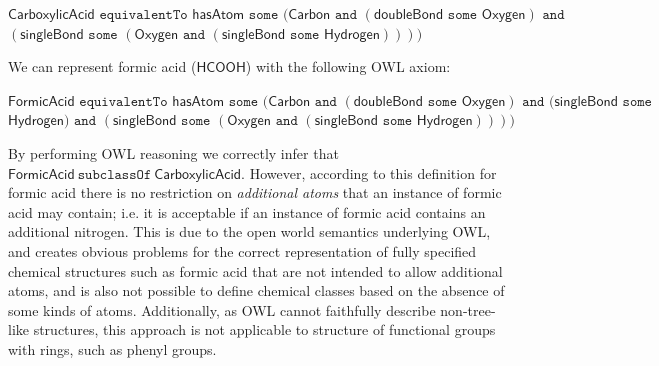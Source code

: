 \documentclass[10pt]{bmc_article}
\newenvironment{bmcformat}{\baselineskip20pt\sloppy\setboolean{publ}{false}}{\baselineskip20pt\sloppy}
\begin{document}
\begin{bmcformat}
\noindent $\mathsf{CarboxylicAcid} \texttt{ equivalentTo } \mathsf{hasAtom} \texttt{ some } 
	(\mathsf{Carbon} \texttt{ and } (\mathsf{doubleBond} \texttt{ some } \mathsf{Oxygen}) 
	    \texttt{ and }$ \\ \hspace*{24mm}$(\mathsf{singleBond} \texttt{ some } (\mathsf{Oxygen} \texttt{ and } (\mathsf{singleBond} \texttt{ some } \mathsf{Hydrogen}))))$

\noindent We can represent formic acid ($\mathsf{HCOOH}$) with the following OWL axiom:

\noindent $\mathsf{FormicAcid} \texttt{ equivalentTo } \mathsf{hasAtom} \texttt{ some } 
	( \mathsf{Carbon} \texttt{ and } (\mathsf{doubleBond} \texttt{ some } \mathsf{Oxygen}) \texttt{ and } (\mathsf{singleBond} \texttt{ some }$
	 \\ \hspace*{24mm}$ \mathsf{Hydrogen}) \texttt{ and } (\mathsf{singleBond} \texttt{ some } (\mathsf{Oxygen} \texttt{ and } (\mathsf{singleBond} \texttt{ some } \mathsf{Hydrogen}))))$
  
\noindent By performing OWL reasoning we correctly infer that $\mathsf{FormicAcid}~ \texttt{subclassOf}~ \mathsf{CarboxylicAcid}$. However, according to this definition for formic acid there is no restriction on \textit{additional atoms} that an instance of formic acid may contain; i.e. it is acceptable if an instance of formic acid contains an additional nitrogen. This is due to the open world semantics underlying OWL, and creates obvious problems for the correct representation of fully specified chemical structures such as formic acid that are not intended to allow additional atoms, and is also not possible to define chemical classes based on the absence of some kinds of atoms. Additionally, as OWL cannot faithfully describe non-tree-like structures, this approach is not applicable to structure of functional groups with rings, such as phenyl groups. 


\end{bmcformat}
\end{document}

